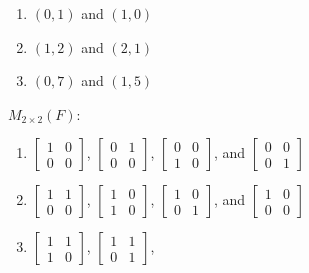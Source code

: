 \documentclass[12pt]{article}
\begin{document}
\begin{enumerate}
\begin{enumerate}
                        \begin{enumerate}
                              \item $(0, 1)$ and $(1, 0)$
                              \item $(1, 2)$ and $(2, 1)$
                              \item $(0, 7)$ and $(1, 5)$
                        \end{enumerate}
                        $M_{2 \times 2}(F)$:
                        \begin{enumerate}
                              \item $\begin{bmatrix}1 & 0 \\ 0 & 0\end{bmatrix}$,
                                    $\begin{bmatrix}0 & 1 \\ 0 & 0\end{bmatrix}$,
                                    $\begin{bmatrix}0 & 0 \\ 1 & 0\end{bmatrix}$, and
                                    $\begin{bmatrix}0 & 0 \\ 0 & 1\end{bmatrix}$
                              \item $\begin{bmatrix}1 & 1 \\ 0 & 0\end{bmatrix}$,
                                    $\begin{bmatrix}1 & 0 \\ 1 & 0\end{bmatrix}$,
                                    $\begin{bmatrix}1 & 0 \\ 0 & 1\end{bmatrix}$, and
                                    $\begin{bmatrix}1 & 0 \\ 0 & 0\end{bmatrix}$
                              \item $\begin{bmatrix}1 & 1 \\ 1 & 0\end{bmatrix}$,
                                    $\begin{bmatrix}1 & 1 \\ 0 & 1\end{bmatrix}$,

\end{enumerate}
\end{enumerate}
\end{enumerate}
\end{document}
